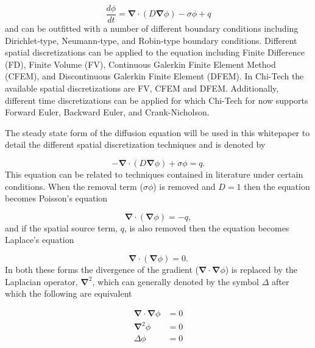 \documentclass[11pt,letterpaper,titlepage]{article}
\newcommand{\bnabla}{\boldsymbol{\nabla}}
\numberwithin{equation}{section}
\begin{document}
\begin{equation} \label{eq:general_diffeq}
\frac{d\phi}{dt} = \bnabla \cdot (D\bnabla\phi) - \sigma \phi + q
\end{equation}
\newline
and can be outfitted with a number of different boundary conditions including Dirichlet-type, Neumann-type, and Robin-type boundary conditions.
Different spatial discretizations can be applied to the equation including Finite Difference (FD), Finite Volume (FV), Continuous Galerkin Finite Element Method (CFEM), and Discontinuous Galerkin Finite Element (DFEM). In Chi-Tech the available spatial discretizations are FV, CFEM and DFEM. Additionally, different time discretizations can be applied for which Chi-Tech for now supports Forward Euler, Backward Euler, and Crank-Nicholson.

The steady state form of the diffusion equation will be used in this whitepaper to detail the different spatial discretization techniques and is denoted by

\begin{equation} \label{eq:steady_diffeq}
-\bnabla \cdot (D\bnabla\phi) + \sigma \phi = q.
\end{equation}
\newline
This equation can be related to techniques contained in literature under certain conditions. When the removal term ($\sigma \phi$) is removed and $D{=}1$ then the equation becomes Poisson's equation 

\begin{equation} \label{eq:poisson_eq}
\bnabla \cdot (\bnabla\phi) = -q,
\end{equation}
\newline
and if the spatial source term, $q$, is also removed then the equation becomes Laplace's equation

\begin{equation} \label{eq:laplace_eq}
\bnabla \cdot (\bnabla\phi) = 0.
\end{equation}
\newline 
In both these forms the divergence of the gradient ($\bnabla\cdot\bnabla\phi$) is replaced by the Laplacian operator, $\bnabla^2$, which can generally denoted by the symbol $\Delta$ after which the following are equivalent 

\begin{equation}
\begin{aligned}
\bnabla\cdot\bnabla\phi &= 0 \\ 
\bnabla^2 \phi &=0 \\
 \Delta\phi &= 0
\end{aligned}
\end{equation} 
\end{document}
